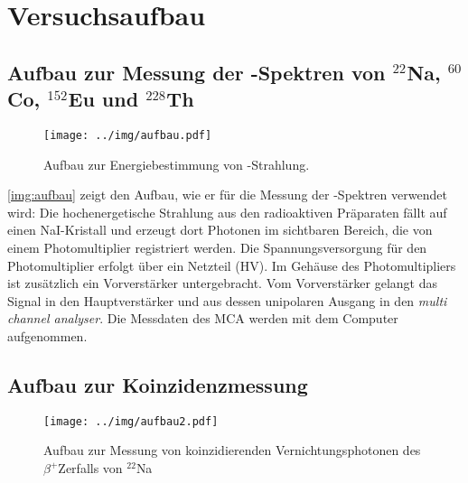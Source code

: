 \section{Versuchsaufbau}

\subsection{Aufbau zur Messung der \textgamma-Spektren von \texorpdfstring{${}^{22}$Na, ${}^{60}$Co, ${}^{152}$Eu und ${}^{228}$Th}{22-Na, 60-Co, 152-Eu und 228-Th}}

\begin{figure}[H]
\begin{center}
  \texttt{[image: ../img/aufbau.pdf]}
  \caption[---]{Aufbau zur Energiebestimmung von \textgamma-Strahlung.}
  \label{img:aufbau}
\end{center}
\end{figure}

\autoref{img:aufbau} zeigt den Aufbau, wie er für die Messung der \textgamma-Spektren verwendet wird:
Die hochenergetische Strahlung aus den radioaktiven Präparaten fällt auf einen NaI-Kristall und
erzeugt dort Photonen im sichtbaren Bereich, die von einem Photomultiplier registriert werden.
Die Spannungsversorgung für den Photomultiplier erfolgt über ein Netzteil (HV).
Im Gehäuse des Photomultipliers ist zusätzlich ein Vorverstärker untergebracht.
Vom Vorverstärker gelangt das Signal in den Hauptverstärker und aus dessen unipolaren Ausgang
in den \emph{multi channel analyser}.
Die Messdaten des MCA werden mit dem Computer aufgenommen.


\subsection{Aufbau zur Koinzidenzmessung}

\begin{figure}[H]
\begin{center}
  \texttt{[image: ../img/aufbau2.pdf]}
  \caption[---]{Aufbau zur Messung von koinzidierenden Vernichtungsphotonen
  des $\beta^+$Zerfalls von ${}^{22}$Na}
  \label{img:aufbau2}
\end{center}
\end{figure}

